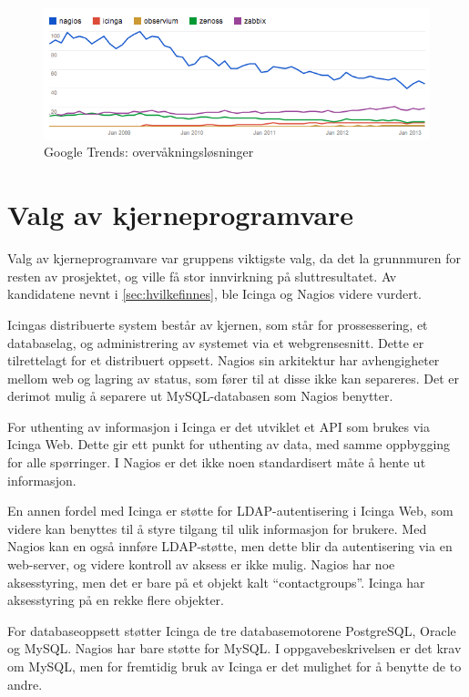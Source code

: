 \begin{figure}[H]
    \centering
    \includegraphics[scale=0.6]{img/monitoring_google_trends}
    \caption{Google Trends: overvåkningsløsninger}
    \label{losninger}
\end{figure}

\section{Valg av kjerneprogramvare}
Valg av kjerneprogramvare var gruppens viktigste valg, da det la grunnmuren for resten av prosjektet, og ville få stor innvirkning på sluttresultatet. Av kandidatene nevnt i \ref{sec:hvilkefinnes}, ble Icinga og Nagios videre vurdert.  

Icingas distribuerte system består av kjernen, som står for prossessering, et databaselag, og administrering av systemet via et webgrensesnitt. Dette er tilrettelagt for et distribuert oppsett. Nagios sin arkitektur har avhengigheter mellom web og lagring av status, som fører til at disse ikke kan separeres. Det er derimot mulig å separere ut MySQL-databasen som Nagios benytter\cite{icingaarchitecture}.

For uthenting av informasjon i Icinga er det utviklet et API som brukes via Icinga Web. Dette gir ett punkt for uthenting av data, med samme oppbygging for alle spørringer. I Nagios er det ikke noen standardisert måte å hente ut informasjon\cite{icingaapi}.

En annen fordel med Icinga er støtte for LDAP-autentisering i Icinga Web, som videre kan benyttes til å styre tilgang til ulik informasjon for brukere. Med Nagios kan en også innføre LDAP-støtte, men dette blir da autentisering via en web-server, og videre kontroll av aksess er ikke mulig. Nagios har noe aksesstyring, men det er bare på et objekt kalt ``contactgroups''. Icinga har aksesstyring på en rekke flere objekter\cite{icingaweb}.

For databaseoppsett støtter Icinga de tre databasemotorene PostgreSQL, Oracle og MySQL. Nagios har bare støtte for MySQL. I oppgavebeskrivelsen er det krav om MySQL, men for fremtidig bruk av Icinga er det mulighet for å benytte de to andre.

